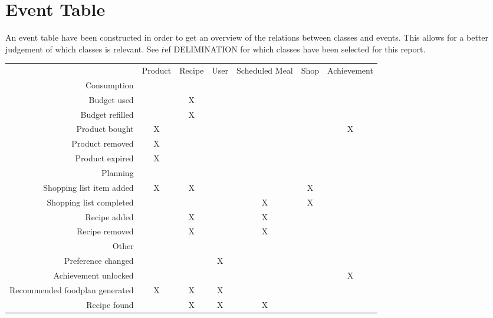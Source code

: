\section{Event Table}
An event table have been constructed in order to get an overview of the relations between classes and events. This allows for a better judgement of which classes is relevant. See \.ref DELIMINATION for which classes have been selected for this report.
\begin{table}[h]
\begin{tabular}{r c c c c c c}
                          \vline           & Product& Recipe & User & Scheduled Meal & Shop & Achievement\\
 Consumption              \vline           &        &        &      &                &      &            \\       
 Budget used    		  \vline           &        &      X &      &                &      &            \\
 Budget refilled		  \vline	       &        &      X &      &                &      &            \\
 Product bought 		  \vline    	   &     X  &        &      &                &      &          X \\
 Product removed		  \vline    	   &     X  &        &      &                &      &            \\
 Product expired		  \vline	       &     X  &        &      &                &      &            \\
 \hline				
 Planning   	          \vline           &        &        &      &                &      &            \\ 
 Shopping list item added \vline    	   &     X  &      X &      &                &    X &            \\
 Shopping list completed  \vline	       &        &        &      &              X &    X &            \\
 Recipe added			  \vline	       &        &      X &      &              X &      &            \\
 Recipe removed           \vline	       &        &      X &      &              X &      &            \\
 \hline           
 Other                    \vline           &        &        &      &                &      &            \\         
 Preference changed       \vline	       &        &        &   X  &                &      &            \\
 Achievement unlocked     \vline	       &        &        &      &                &      &          X \\
 Recommended foodplan generated \vline     &     X  &      X &    X &                &      &            \\
 Recipe found              \vline          &        &      X &    X &              X &      &            
\end{tabular}
\end{table}